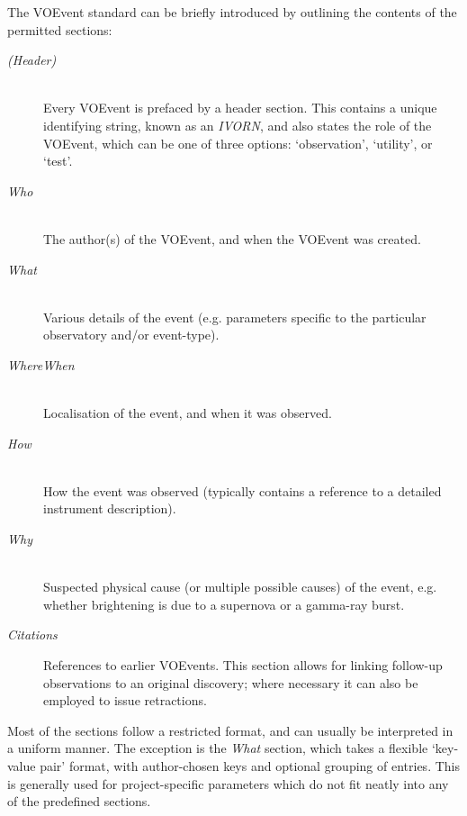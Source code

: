 \documentclass[5p,authoryear]{elsarticle}
\begin{document}
The VOEvent standard can be briefly introduced by outlining the contents of the permitted sections:
\begin{description}
  \item[\textit{(Header)}] \hfill \\
  Every VOEvent is prefaced by a header section. 
  This contains a unique identifying string, known as an \textit{IVORN}, and also states the role of the VOEvent, which can be one of three options: `observation', `utility', or `test'.
  \item[\textit{Who}] \hfill \\
  The author(s) of the VOEvent, and when the VOEvent was created.
  \item[\textit{What}] \hfill \\
  Various details of the event (e.g. parameters specific to the particular observatory and/or event-type).
  \item[\textit{WhereWhen}] \hfill \\
  Localisation of the event, and when it was observed.
  \item[\textit{How}] \hfill \\
  How the event was observed (typically contains a reference to a detailed instrument description).
  \item[\textit{Why}] \hfill \\
  Suspected physical cause (or multiple possible causes) of the event, e.g. whether brightening is due to a supernova or a gamma-ray burst.
  \item[\textit{Citations}]
  References to earlier VOEvents. 
  This section allows for linking follow-up observations to an original discovery; where necessary it can also be employed to issue retractions.
\end{description}
Most of the sections follow a restricted format, and can usually be interpreted in a uniform manner.
The exception is the \textit{What} section, which takes a flexible `key-value pair' format, with author-chosen keys and optional grouping of entries. 
This is generally used for project-specific parameters which do not fit neatly into any of the predefined sections.

\end{document}
